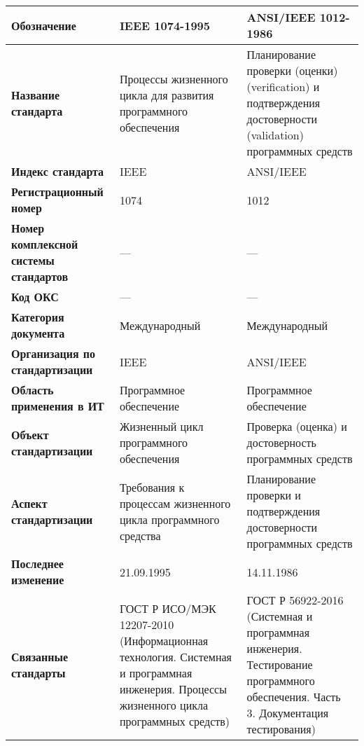 \begin{table}[h!tp]
	\centering
	\caption{}
	\label{table:international}
	\begin{tabular}{|p{10em}|p{12em}|p{12em}|}
		\hline
		\textbf{Обозначение}
			& \textbf{IEEE 1074-1995} & \textbf{ANSI/IEEE 1012-1986} \\ \hline
		\textbf{Название стандарта}
				& Процессы жизненного цикла для развития программного обеспечения
				& Планирование проверки (оценки) (verification)
				и подтверждения достоверности (validation) программных средств \\ \hline
		\textbf{Индекс стандарта}
			& IEEE & ANSI/IEEE \\ \hline
		\textbf{Регистрационный номер}
			& 1074 & 1012 \\ \hline
		\textbf{Номер комплексной системы стандартов}
			& --- & --- \\ \hline
		\textbf{Код ОКС}
			& --- & --- \\ \hline
		\textbf{Категория документа}
			& Международный & Международный \\ \hline
		\textbf{Организация по стандартизации}
			& IEEE & ANSI/IEEE \\ \hline
		\textbf{Область применения в ИТ}
			& Программное обеспечение & Программное обеспечение \\ \hline
		\textbf{Объект стандартизации}
			& Жизненный цикл программного обеспечения
			& Проверка (оценка) и достоверность программных средств \\ \hline
		\textbf{Аспект стандартизации}
			& Требования к процессам жизненного цикла программного средства
			& Планирование проверки и подтверждения достоверности программных средств \\ \hline
		\textbf{Последнее изменение} & 21.09.1995 & 14.11.1986 \\ \hline
		\textbf{Связанные стандарты}
			& ГОСТ Р ИСО/МЭК 12207-2010 (Информационная технология.
			Системная и программная инженерия.
			Процессы жизненного цикла программных средств)
			& ГОСТ Р 56922-2016 (Системная и программная инженерия.
			Тестирование программного обеспечения.
			Часть 3. Документация тестирования)\\ \hline
	\end{tabular}
\end{table}

